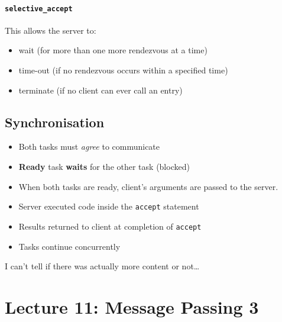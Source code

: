 \documentclass{article}
\begin{document}
\paragraph{\texttt{selective\_accept}}
\label{sec:org00b1dcc}
This allows the server to:
\begin{itemize}
\item wait (for more than one more rendezvous at a time)
\item time-out (if no rendezvous occurs within a specified time)
\item terminate (if no client can ever call an entry)
\end{itemize}

\subsection{Synchronisation}
\label{sec:org980b5bc}
\begin{itemize}
\item Both tasks must \emph{agree} to communicate
\item \textbf{Ready} task \textbf{waits} for the other task (blocked)
\item When both tasks are ready, client's arguments are passed to the server.
\item Server executed code inside the \texttt{accept} statement
\item Results returned to client at completion of \texttt{accept}
\item Tasks continue concurrently
\end{itemize}

I can't tell if there was actually more content or not\ldots{}

\maketitle
\section{Lecture 11: Message Passing 3}
\end{document}
